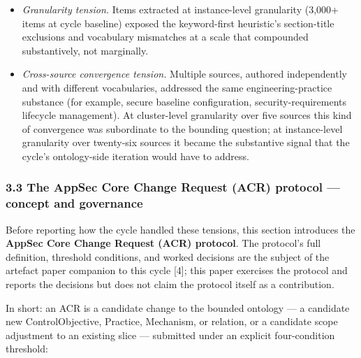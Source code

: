 \documentclass[
]{article}
\providecommand{\tightlist}{%
  \setlength{\itemsep}{0pt}\setlength{\parskip}{0pt}}
\begin{document}
\begin{itemize}
\tightlist
\item
  \emph{Granularity tension.} Items extracted at instance-level
  granularity (3,000+ items at cycle baseline) exposed the keyword-first
  heuristic's section-title exclusions and vocabulary mismatches at a
  scale that compounded substantively, not marginally.
\item
  \emph{Cross-source convergence tension.} Multiple sources, authored
  independently and with different vocabularies, addressed the same
  engineering-practice substance (for example, secure baseline
  configuration, security-requirements lifecycle management). At
  cluster-level granularity over five sources this kind of convergence
  was subordinate to the bounding question; at instance-level
  granularity over twenty-six sources it became the substantive signal
  that the cycle's ontology-side iteration would have to address.
\end{itemize}

\subsubsection{3.3 The AppSec Core Change Request (ACR) protocol ---
concept and
governance}\label{the-appsec-core-change-request-acr-protocol-concept-and-governance}

Before reporting how the cycle handled these tensions, this section
introduces the \textbf{AppSec Core Change Request (ACR) protocol}. The
protocol's full definition, threshold conditions, and worked decisions
are the subject of the artefact paper companion to this cycle {[}4{]};
this paper exercises the protocol and reports the decisions but does not
claim the protocol itself as a contribution.

In short: an ACR is a candidate change to the bounded ontology --- a
candidate new ControlObjective, Practice, Mechanism, or relation, or a
candidate scope adjustment to an existing slice --- submitted under an
explicit four-condition threshold:
\end{document}
